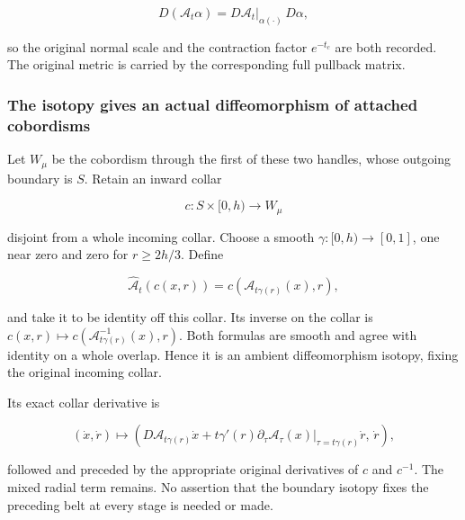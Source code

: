 \begin{equation}
D(\mathcal A_t\alpha)=D\mathcal A_t|_{\alpha(\cdot)}\,D\alpha,
\label{courseIII:rearranging-the-original-framed-handles:eq:4.8}
\end{equation}

so the original normal scale and the contraction factor \(e^{-t_c}\) are both recorded. The original metric is carried by the corresponding full pullback matrix.

\subsubsection{The isotopy gives an actual diffeomorphism of attached cobordisms}
\label{courseIII:rearranging-the-original-framed-handles:section-4.2}

Let \(W_\mu\) be the cobordism through the first of these two handles, whose outgoing boundary is \(S\). Retain an inward collar

\begin{equation}
c:S\times[0,h)\longrightarrow W_\mu
\label{courseIII:rearranging-the-original-framed-handles:eq:4.9}
\end{equation}

disjoint from a whole incoming collar. Choose a smooth \(\gamma:[0,h)\to[0,1]\), one near zero and zero for \(r\geq2h/3\). Define

\begin{equation}
\widehat{\mathcal A}_t(c(x,r))
=c(\mathcal A_{t\gamma(r)}(x),r),
\label{courseIII:rearranging-the-original-framed-handles:eq:4.10}
\end{equation}

and take it to be identity off this collar. Its inverse on the collar is \(c(x,r)\mapsto c(\mathcal A_{t\gamma(r)}^{-1}(x),r)\). Both formulas are smooth and agree with identity on a whole overlap. Hence it is an ambient diffeomorphism isotopy, fixing the original incoming collar.

Its exact collar derivative is

\begin{equation}
(\dot x,\dot r)\longmapsto
\left(
D\mathcal A_{t\gamma(r)}\dot x
+t\gamma'(r)
 \left.\partial_\tau\mathcal A_\tau(x)\right|_{\tau=t\gamma(r)}
 \dot r,\,
\dot r
\right),
\label{courseIII:rearranging-the-original-framed-handles:eq:4.11}
\end{equation}

followed and preceded by the appropriate original derivatives of \(c\) and \(c^{-1}\). The mixed radial term remains. No assertion that the boundary isotopy fixes the preceding belt at every stage is needed or made.

